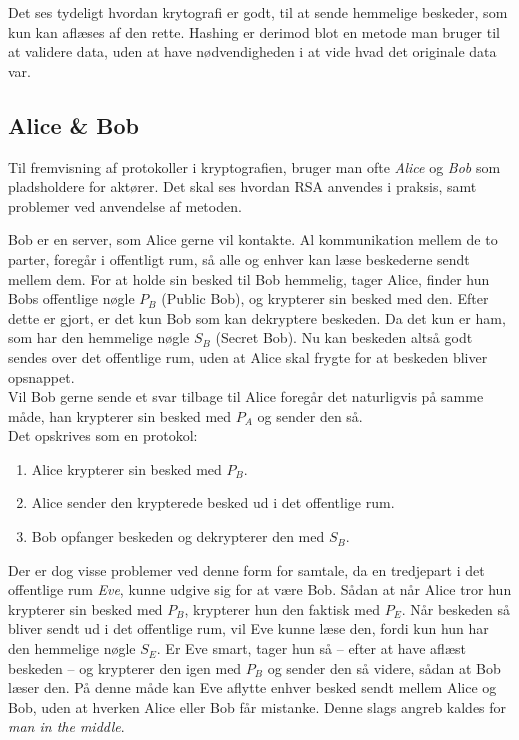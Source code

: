 Det ses tydeligt hvordan krytografi er godt, til at sende hemmelige beskeder, som kun kan aflæses af den rette.
Hashing er derimod blot en metode man bruger til at validere data, uden at have nødvendigheden i at vide hvad det originale data var.


    \subsection{Alice \& Bob}
    Til fremvisning af protokoller i kryptografien, bruger man ofte \emph{Alice} og \emph{Bob} som pladsholdere for aktører.
    Det skal ses hvordan RSA anvendes i praksis, samt problemer ved anvendelse af metoden.

    \begin{eks}
        Bob er en server, som Alice gerne vil kontakte.
        Al kommunikation mellem de to parter, foregår i offentligt rum, så alle og enhver kan læse beskederne sendt mellem dem.
        For at holde sin besked til Bob hemmelig, tager Alice, finder hun Bobs offentlige nøgle \(P_B\) (Public Bob), og krypterer sin besked med den.
        Efter dette er gjort, er det kun Bob som kan dekryptere beskeden. Da det kun er ham, som har den hemmelige nøgle \(S_B\) (Secret Bob).
        Nu kan beskeden altså godt sendes over det offentlige rum, uden at Alice skal frygte for at beskeden bliver opsnappet.\\
        Vil Bob gerne sende et svar tilbage til Alice foregår det naturligvis på samme måde, han krypterer sin besked med \(P_A\) og sender den så.\\

        Det opskrives som en protokol:
        \begin{enumerate}[noitemsep]
            \item Alice krypterer sin besked med \(P_B\).
            \item Alice sender den krypterede besked ud i det offentlige rum.
            \item Bob opfanger beskeden og dekrypterer den med \(S_B\).
        \end{enumerate}
    \end{eks}

    Der er dog visse problemer ved denne form for samtale, da en tredjepart i det offentlige rum \emph{Eve}, kunne udgive sig for at være Bob.
    Sådan at når Alice tror hun krypterer sin besked med \(P_B\), krypterer hun den faktisk med \(P_E\).
    Når beskeden så bliver sendt ud i det offentlige rum, vil Eve kunne læse den, fordi kun hun har den hemmelige nøgle \(S_E\).
    Er Eve smart, tager hun så -- efter at have aflæst beskeden -- og krypterer den igen med \(P_B\) og sender den så videre, sådan at Bob læser den.
    På denne måde kan Eve aflytte enhver besked sendt mellem Alice og Bob, uden at hverken Alice eller Bob får mistanke.
    Denne slags angreb kaldes for \emph{man in the middle}. \cite{ytmitm}



